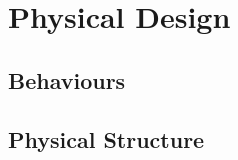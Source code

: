 \documentclass[12pt,a4paper]{article}
\begin{document}
\section{Physical Design}

\subsection{Behaviours}




\subsection{Physical Structure}

\end{document}

